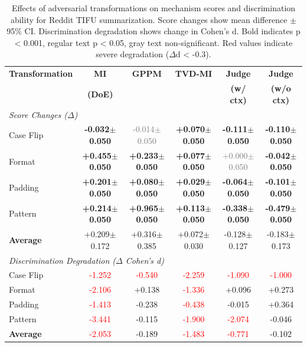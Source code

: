 
\begin{table}[t]
\centering
\caption{Effects of adversarial transformations on mechanism scores and discrimination ability for Reddit TIFU summarization. Score changes show mean difference $\pm$ 95\% CI. Discrimination degradation shows change in Cohen's d. Bold indicates p < 0.001, regular text p < 0.05, gray text non-significant. Red values indicate severe degradation ($\Delta$d < -0.3).}
\label{tab:tampering_comprehensive}
\footnotesize
\begin{tabular}{@{}lccccc@{}}
\toprule
\textbf{Transformation} & \textbf{MI} & \textbf{GPPM} & \textbf{TVD-MI} & \textbf{Judge} & \textbf{Judge} \\
& \textbf{(DoE)} & & & \textbf{(w/ ctx)} & \textbf{(w/o ctx)} \\
\midrule
\multicolumn{6}{l}{\textit{Score Changes ($\Delta$)}} \\
Case Flip & \textbf{-0.032$\pm$0.050} & \textcolor{gray}{-0.014$\pm$0.050} & \textbf{+0.070$\pm$0.050} & \textbf{-0.111$\pm$0.050} & \textbf{-0.110$\pm$0.050} \\
Format & \textbf{+0.455$\pm$0.050} & \textbf{+0.233$\pm$0.050} & \textbf{+0.077$\pm$0.050} & \textcolor{gray}{+0.000$\pm$0.050} & \textbf{-0.042$\pm$0.050} \\
Padding & \textbf{+0.201$\pm$0.050} & \textbf{+0.080$\pm$0.050} & \textbf{+0.029$\pm$0.050} & \textbf{-0.064$\pm$0.050} & \textbf{-0.101$\pm$0.050} \\
Pattern & \textbf{+0.214$\pm$0.050} & \textbf{+0.965$\pm$0.050} & \textbf{+0.113$\pm$0.050} & \textbf{-0.338$\pm$0.050} & \textbf{-0.479$\pm$0.050} \\
\textbf{Average} & +0.209$\pm$0.172 & +0.316$\pm$0.385 & +0.072$\pm$0.030 & -0.128$\pm$0.127 & -0.183$\pm$0.173 \\
\midrule
\multicolumn{6}{l}{\textit{Discrimination Degradation ($\Delta$ Cohen's d)}} \\
Case Flip & \textcolor{red}{-1.252} & \textcolor{red}{-0.540} & \textcolor{red}{-2.259} & \textcolor{red}{-1.090} & \textcolor{red}{-1.000} \\
Format & \textcolor{red}{-2.106} & +0.138 & \textcolor{red}{-1.336} & +0.096 & +0.273 \\
Padding & \textcolor{red}{-1.413} & -0.238 & \textcolor{red}{-0.438} & -0.015 & +0.364 \\
Pattern & \textcolor{red}{-3.441} & -0.115 & \textcolor{red}{-1.900} & \textcolor{red}{-2.074} & -0.046 \\
\textbf{Average} & \textcolor{red}{-2.053} & -0.189 & \textcolor{red}{-1.483} & \textcolor{red}{-0.771} & -0.102 \\
\bottomrule
\end{tabular}
\end{table}